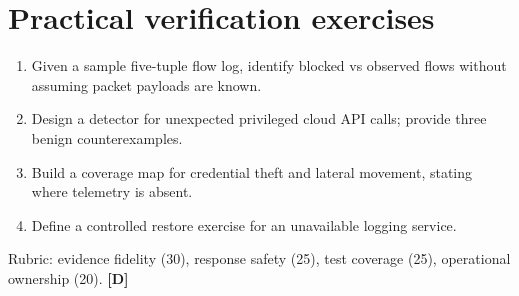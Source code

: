 \documentclass[10pt,letterpaper,oneside]{article}
\newcommand{\designed}{\textsf{\color{accent}\textbf{[D]}}}
\begin{document}
\section{Practical verification exercises}
\begin{enumerate}
\item Given a sample five-tuple flow log, identify blocked vs observed flows without assuming packet payloads are known.
\item Design a detector for unexpected privileged cloud API calls; provide three benign counterexamples.
\item Build a coverage map for credential theft and lateral movement, stating where telemetry is absent.
\item Define a controlled restore exercise for an unavailable logging service.
\end{enumerate}
Rubric: evidence fidelity (30), response safety (25), test coverage (25), operational ownership (20). \designed{}
\end{document}
